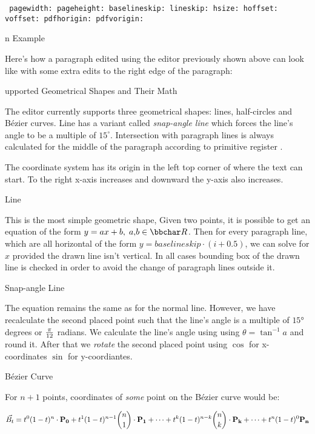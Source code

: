 {\tt
	\nl
	pagewidth: \the\pagewidth \nl
	pageheight: \the\pageheight \nl
	baselineskip: \the\baselineskip \nl
	lineskip: \the\lineskip \nl
	hsize: \the\hsize \nl
	hoffset: \the\hoffset \nl
	voffset: \the\voffset \nl
	pdfhorigin: \the\pdfhorigin \nl
	pdfvorigin: \the\pdfvorigin \nl
}
\endmulti

\subtitle An Example

Here's how a paragraph edited using the editor previously shown above can look like
with some extra edits to the right edge of the paragraph:

\exampleparshape
\loremonepar

\subtitle Supported Geometrical Shapes and Their Math

The editor currently supports three geometrical shapes: lines, half-circles and Bézier curves.
Line has a variant called {\it snap-angle line} which forces the line's angle to be
a multiple of $15^{\circ}$.
Intersection with paragraph lines is always calculated for the middle of the paragraph
according to primitive register .

The coordinate system has its origin in the left top corner of where the text can start.
To the right x-axis increases and downward the y-axis also increases.

\curvetitle Line

This is the most simple geometric shape, Given two points, it is possible to get an equation
of the form $y = ax + b,\;a,\!b \in {\bbchar R}$. Then for every paragraph line, which are all
horizontal of the form $y = baselineskip \cdot (i + 0.5)$, we can solve for $x$
provided the drawn line isn't vertical. In all cases bounding box of the drawn line is checked
in order to avoid the change of paragraph lines outside it.

\curvetitle Snap-angle Line

The equation remains the same as for the normal line. However, we have recalculate the second placed
point such that the line's angle is a multiple of $\ang{15}$ degrees or $\pi \over 12$ radians.
We calculate the line's angle using using $\theta = \tan^{-1}{a}$ and round it.
After that we {\it rotate} the second placed point using $\cos$ for x-coordinates $\sin$
for y-coordiantes.

\curvetitle Bézier Curve

For $n+1$ points, coordinates of {\it some} point on the Bézier curve would be:

$$
\vec{B_t} =
t^0 (1-t)^n \cdot {\bf P_0} +
t^1 (1-t)^{n-1} {n \choose 1} \cdot {\bf P_1} +
\cdots +
t^k (1-t)^{n-k} {n \choose k} \cdot {\bf P_k} +
\cdots +
t^n (1-t)^0 {\bf P_n}
$$

